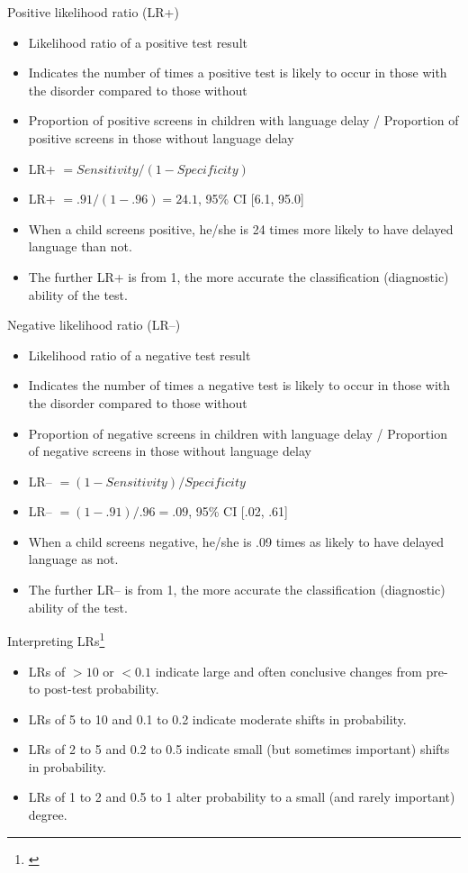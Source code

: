 \documentclass{beamer}
\begin{document}
\begin{frame}{Positive likelihood ratio (LR+)}
	\begin{itemize}
	\item Likelihood ratio of a positive test result
	\item Indicates the number of times a positive test is likely to occur in those with the disorder compared to those without
	\item Proportion of positive screens in children with language delay / Proportion of positive screens in those without language delay 
	\item LR+ $= Sensitivity / (1 - Specificity)$
	\item LR+ $= .91 / (1 - .96) = 24.1$, 95\% CI [6.1, 95.0]
	\item When a child screens positive, he/she is 24 times more likely to have delayed language than not.
	\item The further LR+ is from 1, the more accurate the classification (diagnostic) ability of the test.
	\end{itemize}
\end{frame}

\begin{frame}{Negative likelihood ratio (LR--)}
	\begin{itemize}
	\item Likelihood ratio of a negative test result
	\item Indicates the number of times a negative test is likely to occur in those with the disorder compared to those without
	\item Proportion of negative screens in children with language delay / Proportion of negative screens in those without language delay 
	\item LR-- $= (1 - Sensitivity) /  Specificity$
	\item LR-- $= (1 - .91) / .96 = .09$, 95\% CI [.02, .61]
	\item When a child screens negative, he/she is .09 times as likely to have delayed language as not.
	\item The further LR-- is from 1, the more accurate the classification (diagnostic) ability of the test.
	\end{itemize}
\end{frame}

\begin{frame}{Interpreting LRs\footnote{\tiny{\citet[p. 208]{Guyatt2008d}}}}
	\begin{itemize}
	\item LRs of  $>10$ or $<0.1$ indicate large and often conclusive changes from pre- to post-test probability.
	\item LRs of 5 to 10 and 0.1 to 0.2 indicate moderate shifts in probability.
	\item LRs of  2 to 5 and 0.2 to 0.5 indicate small (but sometimes important) shifts in probability.
	\item LRs of 1 to 2 and 0.5 to 1 alter probability to a small (and rarely important) degree.
	\end{itemize}
\end{frame}
\end{document}
